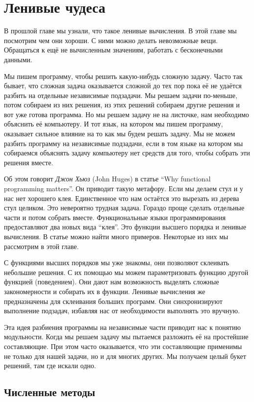\chapter{Ленивые чудеса}

В прошлой главе мы узнали, что такое ленивые вычисления. В этой главе мы
посмотрим чем они хороши. С ними можно делать невозможные вещи.
Обращаться к ещё не вычисленным значениям, работать с бесконечными
данными.

Мы пишем программу, чтобы решить какую-нибудь сложную задачу. Часто так
бывает, что сложная задача оказывается сложной до тех пор пока её не
удаётся разбить на отдельные независимые подзадачи. Мы решаем задачи
по-меньше, потом собираем из них решения, из этих решений собираем
другие решения и вот уже готова программа. Но мы решаем задачу не на
листочке, нам необходимо объяснить её компьютеру. И тот язык, на котором
мы пишем программу, оказывает сильное влияние на то как мы будем решать
задачу. Мы не можем разбить программу на независимые подзадачи, если в
том языке на котором мы собираемся объяснять задачу компьютеру нет
средств для того, чтобы собрать эти решения вместе.

Об этом говорит \emph{Джон Хьюз} (John Huges) в статье ``Why functional
programming matters''. Он приводит такую метафору. Если мы делаем стул и
у нас нет хорошего клея. Единственное что нам остаётся это вырезать из
дерева стул целиком. Это невероятно трудная задача. Гораздо проще
сделать отдельные части и потом собрать вместе. Функциональные языки
программирования предоставляют два новых вида ``клея''. Это функции
высшего порядка и ленивые вычисления. В статье можно найти много
примеров. Некоторые из них мы рассмотрим в этой главе.

С функциями высших порядков мы уже знакомы, они позволяют склеивать
небольшие решения. С их помощью мы можем параметризовать функцию другой
функцией (поведением). Они дают нам возможность выделять сложные
закономерности и собирать их в функции. Ленивые вычисления же
предназначены для склеивания больших программ. Они синхронизируют
выполнение подзадач, избавляя нас от необходимости выполнять это
вручную.

Эта идея разбиения программы на независимые части приводит нас к понятию
модульности. Когда мы решаем задачу мы пытаемся разложить её на
простейшие составляющие. При этом часто оказывается, что эти
составляющие применимы не только для нашей задачи, но и для многих
других. Мы получаем целый букет решений, там где искали одно.

\section{Численные методы}

